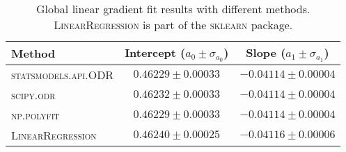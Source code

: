 
\begin{table}
\caption{Global linear gradient fit results with different methods. \textsc{LinearRegression} is part of the \textsc{sklearn} package.}
\label{tab:global_fit_results_per_method}
\begin{tabularx}{\columnwidth}{lCC}
\hline
Method & Intercept ($a_0 \pm \sigma_{a_0}$) & Slope ($a_1 \pm \sigma_{a_1}$) \\
\hline
\textsc{statsmodels.api.ODR} & $0.46229 \pm 0.00033$ & $-0.04114 \pm 0.00004$ \\
\textsc{scipy.odr} & $0.46232 \pm 0.00033$ & $-0.04114 \pm 0.00004$ \\
\textsc{np.polyfit} & $0.46229 \pm 0.00033$ & $-0.04114 \pm 0.00004$ \\
\textsc{LinearRegression} & $0.46240 \pm 0.00025$ & $-0.04116 \pm 0.00006$ \\
\hline
\end{tabularx}
\end{table}
